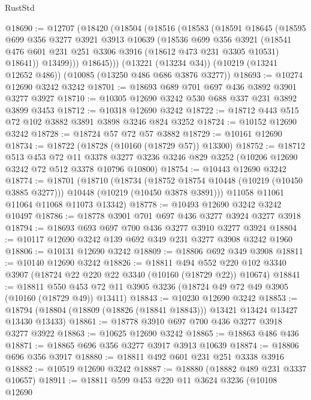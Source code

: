 \begin{lexlean}{RustStd}
\begin{coremodule}
@18690 := @12707
    (@18420
      (@18504
        (@18516
          (@18583
            (@18591
              @18645
              (@18595
                @699
                @356
                @3277
                @3921
                @3913
                @10639
                (@18536
                  @699
                  @356
                  @3921
                  (@18541 @476 @601 @231 @251 @3306 @3916 (@18612 @473 @231 @3305 @10531) @18641))
                @13499)))
          @18645)))
    (@13221 (@13234 @34))
    (@10219 (@13241 @12652 @486))
    (@10085 (@13250 @486 @686 @3876 @3277))
@18693 := @10274 @12690 @3242 @3242
@18701 := @18693 @689 @701 @697 @436 @3892 @3901 @3277 @3927
@18710 := @10305 @12690 @3242 @530 @688 @337 @231 @3892 @3899 @3453
@18712 := @10318 @12690 @3242
@18722 := @18712 @443 @515 @72 @102 @3882 @3891 @3898 @3246 @824 @3252
@18724 := @10152 @12690 @3242
@18728 := @18724 @57 @72 @57 @3882
@18729 := @10161 @12690
@18734 := @18722 (@18728 (@10160 (@18729 @57)) @13300)
@18752 := @18712
    @513
    @453
    @72
    @11
    @3378
    @3277
    @3236
    @3246
    @829
    @3252
    (@10206 @12690 @3242 @72 @512 @3378 @10796 @10800)
@18754 := @10443 @12690 @3242
@18774 := @18701
    (@18710
      (@18734
        (@18752 @18754 @10448 (@10219 (@10450 @3885 @3277)))
        @10448
        (@10219 (@10450 @3878 @3891)))
      @11058
      @11061
      @11064
      @11068
      @11073
      @13342)
@18778 := @10493 @12690 @3242 @3242 @10497
@18786 := @18778 @3901 @701 @697 @436 @3277 @3924 @3277 @3918
@18794 := @18693 @693 @697 @700 @436 @3277 @3910 @3277 @3924
@18804 := @10117 @12690 @3242 @139 @692 @349 @231 @3277 @3908 @3242 @1960
@18806 := @10131 @12690 @3242
@18809 := @18806 @692 @349 @3908
@18811 := @10140 @12690 @3242
@18826 := @18811
    @494
    @552
    @220
    @102
    @3340
    @3907
    (@18724 @22 @220 @22 @3340 (@10160 (@18729 @22)) @10674)
@18841 := @18811
    @550
    @453
    @72
    @11
    @3905
    @3236
    (@18724 @49 @72 @49 @3905 (@10160 (@18729 @49)) @13411)
@18843 := @10230 @12690 @3242
@18853 := @18794 (@18804 (@18809 (@18826 (@18841 @18843))) @13421 @13424 @13427 @13430 @13433)
@18861 := @18778 @3910 @697 @700 @436 @3277 @3918 @3277 @3922
@18863 := @10625 @12690 @3242
@18865 := @18863 @486 @436
@18871 := @18865 @696 @356 @3277 @3917 @3913 @10639
@18874 := @18806 @696 @356 @3917
@18880 := @18811 @492 @601 @231 @251 @3338 @3916
@18882 := @10519 @12690 @3242
@18887 := @18880 (@18882 @489 @231 @3337 @10657)
@18911 := @18811
    @599
    @453
    @220
    @11
    @3624
    @3236
    (@10108
      @12690

\end{coremodule}
\end{lexlean}

